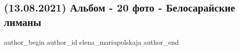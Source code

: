  
 
 
 
 

\subsection{(13.08.2021) Альбом - 20 фото - Белосарайские лиманы}
\label{sec:13_08_2021.fb.elena_mariupolskaja.1.album_20_foto_belosaraj_limany}

\ifcmt
 author_begin
   author_id elena_mariupolskaja
 author_end
\fi

